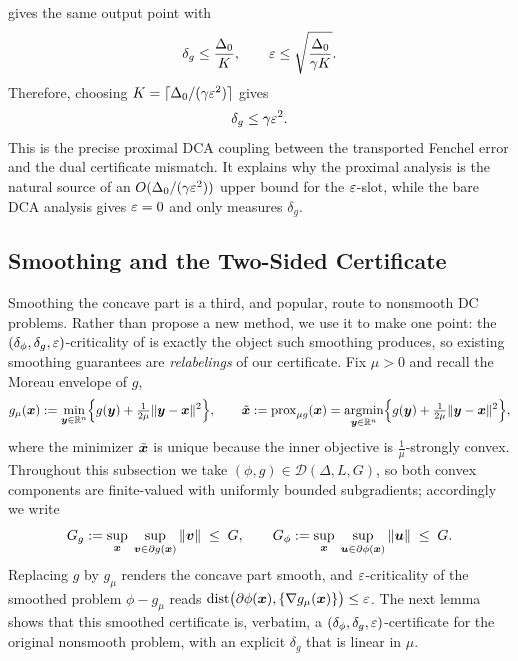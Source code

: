 \begin{remark}
\label{rem:prox-deltag-eps-coupling}
 gives the same output point with
\[
    \delta_g
    \le
    \frac{\Delta_0}{K},
    \qquad
    \varepsilon
    \le
    \sqrt{\frac{\Delta_0}{\gamma K}}.
\]
Therefore, choosing $K=\lceil\Delta_0/(\gamma\varepsilon^2)\rceil$ gives
\[
    \delta_g\le\gamma\varepsilon^2.
\]
This is the precise proximal DCA coupling between the transported
Fenchel error and the dual certificate mismatch. It explains why the
proximal analysis is the natural source of an
$O(\Delta_0/(\gamma\varepsilon^2))$ upper bound for the $\varepsilon$-slot, while the
bare DCA analysis gives $\varepsilon=0$ and only measures $\delta_g$.
\end{remark}

\subsection{Smoothing and the Two-Sided Certificate}
\label{sec:smoothing-certificate}

Smoothing the concave part is a third, and popular, route to nonsmooth DC
problems. Rather than propose a new method, we use it to make one point: the
$(\delta_{\phi},\delta_g,\varepsilon)$-criticality of  is
exactly the object such smoothing produces, so existing smoothing guarantees are
\emph{relabelings} of our certificate. Fix $\mu>0$ and recall the Moreau
envelope of $g$,
\begin{equation}
    g_\mu(\bm{x})
    :=
    \min_{\bm{y}\in\mathbb{R}^n}
    \Bigl\{
        g(\bm{y})+\tfrac{1}{2\mu}\|\bm{y}-\bm{x}\|^2
    \Bigr\},
    \qquad
    \tilde{\bm{x}}:=\mathrm{prox}_{\mu g}(\bm{x})
    =\operatorname*{\mathrm{argmin}}_{\bm{y}\in\mathbb{R}^n}
    \Bigl\{
        g(\bm{y})+\tfrac{1}{2\mu}\|\bm{y}-\bm{x}\|^2
    \Bigr\},
    \label{eq:moreau-envelope}
\end{equation}
where the minimizer $\tilde{\bm{x}}$ is unique because the inner objective is
$\tfrac1\mu$-strongly convex. Throughout this subsection we take
$(\phi,g)\in\mathcal D(\Delta,L,G)$, so both convex components are
finite-valued with uniformly bounded subgradients; accordingly we write
\[
    G_g:=\sup_{\bm{x}}\;\sup_{\bm{v}\in\partial g(\bm{x})}\|\bm{v}\|\;\le\;G,
    \qquad
    G_\phi:=\sup_{\bm{x}}\;\sup_{\bm{u}\in\partial\phi(\bm{x})}\|\bm{u}\|\;\le\;G .
\]
Replacing $g$ by $g_\mu$ renders the concave part smooth, and
$\varepsilon$-criticality of the smoothed problem $\phi-g_\mu$ reads
$\operatorname{dist}\bigl(\partial\phi(\bm{x}),\{\nabla g_\mu(\bm{x})\}\bigr)\le\varepsilon$.
The next lemma shows that this smoothed certificate is, verbatim, a
$(\delta_{\phi},\delta_g,\varepsilon)$-certificate for the original nonsmooth problem,
with an explicit $\delta_g$ that is linear in $\mu$.

